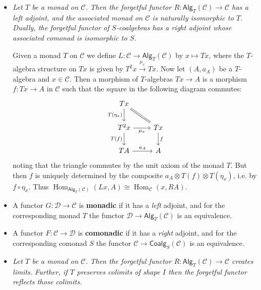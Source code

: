 \documentclass[10pt]{article}
\newcommand{\ccat}{\mathcal{C}}
\newcommand{\dcat}{\mathcal{D}}
\newcommand{\Alg}{\mathsf{Alg}}
\newcommand{\Coalg}{\mathsf{Coalg}}
\DeclareMathOperator{\Hom}{Hom}
\begin{document}
            \begin{itemize}
                \item \emph{Let $T$ be a monad on $\ccat$.}
                    \emph{Then the forgetful functor $R\colon\Alg_T(\ccat)\to\ccat$ has a \emph{left} adjoint, and the associated monad on $\ccat$ is naturally isomorphic to $T$.}
                    \emph{Dually, the forgetful functor of $S$-coalgebras has a \emph{right} adjoint whose associated comonad is isomorphic to $S$.}

                    Given a monad $T$ on $\ccat$ we define $L\colon\ccat\to\Alg_T(\ccat)$ by $x\mapsto Tx$, where the $T$-algebra structure on $Tx$ is given by $T^2x\xrightarrow{\mu_x}Tx$.
                    Now let $(A,a_A)$ be a $T$-algebra and $x\in\ccat$.
                    Then a morphism of $T$-algebras $Tx\to A$ is a morphism $f\colon Tx\to A$ in $\ccat$ such that the square in the following diagram commutes:
                    \begin{equation*}
                        \begin{tikzcd}
                            Tx \ar{d}[swap]{T(\eta_x)} \ar[equal]{dr}
                            &\\
                            T^2x \ar{r}[swap]{\mu_x} \ar{d}[swap]{T(f)}
                            & Tx \ar{d}{f}\\
                            TA \ar{r}{a_A}
                            & A
                        \end{tikzcd}
                    \end{equation*}
                    noting that the triangle commutes by the unit axiom of the monad $T$.
                    But then $f$ is uniquely determined by the composite $a_A\otimes T(f)\otimes T(\eta_x)$, i.e. by $f\circ\eta_x$.
                    Thus $\Hom_{\Alg_T(\ccat)}(Lx,A)\cong\Hom_\ccat(x,RA)$.
                \item A functor $G\colon\dcat\to\ccat$ is \textbf{monadic} if it has a \emph{left} adjoint, and for the corresponding monad $T$ the functor $\dcat\to\Alg_T(\ccat)$ is an equivalence.
                \item A functor $F\colon\ccat\to\dcat$ is \textbf{comonadic} if it has a \emph{right} adjoint, and for the corresponding comonad $S$ the functor $\ccat\to\Coalg_S(\ccat)$ is an equivalence.
                \item \emph{Let $T$ be a monad on $\ccat$.}
                    \emph{Then the forgetful functor $R\colon\Alg_T(\ccat)\to\ccat$ creates \emph{limits}.}
                    \emph{Further, if $T$ preserves \emph{colimits} of shape $I$ then the forgetful functor reflects those colimits.}


\end{itemize}
\end{document}
